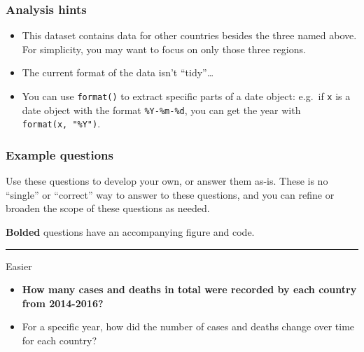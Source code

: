 \documentclass[
  letterpaper,
  DIV=11,
  numbers=noendperiod]{scrreprt}
\providecommand{\tightlist}{%
  \setlength{\itemsep}{0pt}\setlength{\parskip}{0pt}}\usepackage{longtable,booktabs,array}
\begin{document}
\begin{tcolorbox}[enhanced jigsaw, left=2mm, colframe=quarto-callout-tip-color-frame, leftrule=.75mm, opacitybacktitle=0.6, toptitle=1mm, title=\textcolor{quarto-callout-tip-color}{\faLightbulb}\hspace{0.5em}{Tip}, opacityback=0, coltitle=black, colbacktitle=quarto-callout-tip-color!10!white, breakable, colback=white, titlerule=0mm, bottomrule=.15mm, arc=.35mm, bottomtitle=1mm, rightrule=.15mm, toprule=.15mm]

\hypertarget{analysis-hints-1}{%
\subsubsection{Analysis hints}\label{analysis-hints-1}}

\begin{itemize}
\item
  This dataset contains data for other countries besides the three named
  above. For simplicity, you may want to focus on only those three
  regions.
\item
  The current format of the data isn't ``tidy''\ldots{}
\item
  You can use \texttt{format()} to extract specific parts of a date
  object: e.g.~if \texttt{x} is a date object with the format
  \texttt{\%Y-\%m-\%d}, you can get the year with
  \texttt{format(x,\ "\%Y")}.
\end{itemize}

\hypertarget{example-questions-1}{%
\subsubsection{Example questions}\label{example-questions-1}}

Use these questions to develop your own, or answer them as-is. These is
no ``single'' or ``correct'' way to answer to these questions, and you
can refine or broaden the scope of these questions as needed.

\textbf{Bolded} questions have an accompanying figure and code.

\begin{center}\rule{0.5\linewidth}{0.5pt}\end{center}

Easier

\begin{itemize}
\tightlist
\item
  \textbf{How many cases and deaths in total were recorded by each
  country from 2014-2016?}
\item
  For a specific year, how did the number of cases and deaths change
  over time for each country?
\end{itemize}


\end{tcolorbox}
\end{document}
